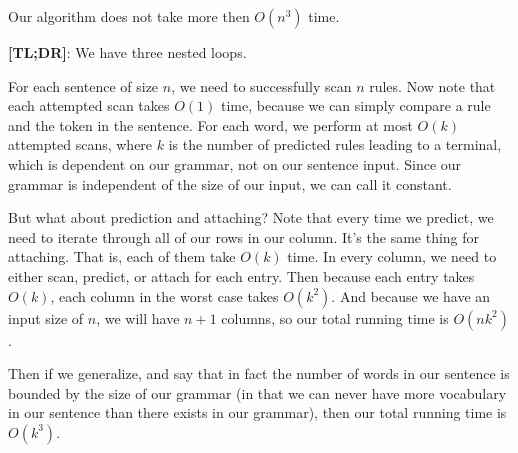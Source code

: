 \documentclass[11pt]{article}
\begin{document}
\begin{enumerate}
\begin{enumerate}[label=(\alph*)]
		Our algorithm does not take more then $O(n^3)$ time. 

		{\bf[TL;DR]}: We have three nested loops.

		For each sentence of size $n$, we need to successfully scan $n$ rules. Now note that each attempted scan takes $O(1)$ time, because we can simply compare a rule and the token in the sentence. For each word, we perform at most $O(k)$ attempted scans, where $k$ is the number of predicted rules leading to a terminal, which is dependent on our grammar, not on our sentence input. Since our grammar is independent of the size of our input, we can call it constant.

		But what about prediction and attaching? Note that every time we predict, we need to iterate through all of our rows in our column. It's the same thing for attaching. That is, each of them take $O(k)$ time. In every column, we need to either scan, predict, or attach for each entry. Then because each entry takes $O(k)$, each column in the worst case takes $O(k^2)$. And because we have an input size of $n$, we will have $n+1$ columns, so our total running time is $O(nk^2)$.

		Then if we generalize, and say that in fact the number of words in our sentence is bounded by the size of our grammar (in that we can never have more vocabulary in our sentence than there exists in our grammar), then our total running time is $O(k^3)$.


\end{enumerate}
\end{enumerate}
\end{document}
